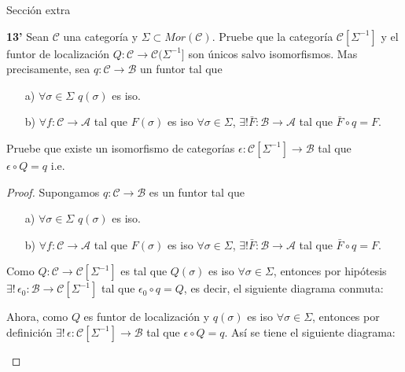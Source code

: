 \documentclass{article}
\begin{document}
\begin{enumerate}
Sección extra

\textbf{13'} Sean $\mathscr{C}$ una categoría y $\Sigma\subset Mor(\mathscr{C})$. Pruebe que la categoría $\mathscr{C}[\Sigma^{-1}]$ y el 
funtor de localización $Q:\mathscr{C}\rightarrow \mathscr{C}(\Sigma^{-1}]$ son únicos salvo isomorfismos. Mas precisamente, sea $q:\mathscr{C}
\rightarrow \mathscr{B}$ un funtor tal que 
\begin{itemize}
\item[a)] $\forall \sigma\in \Sigma$ \quad $q(\sigma)$ es iso.
\item[b)] $\forall f:\mathscr{C}\to \mathscr{A}$ tal que $F(\sigma)$ es iso $\forall \sigma\in \Sigma$, $\exists ! \bar{F}:\mathscr{B}\to\mathscr{A}$
tal que $\bar{F}\circ q=F$.\\
\end{itemize}
Pruebe que existe un isomorfismo de categorías $\epsilon:\mathscr{C}[\Sigma^{-1}]\to \mathscr{B}$ tal que \\$\epsilon\circ Q=q$ \quad i.e. \\
\centerline{
}
\begin{proof}
Supongamos $q:\mathscr{C}\to \mathscr{B}$ es un funtor tal que 
\begin{itemize}
\item[a)] $\forall \sigma\in \Sigma$ \quad $q(\sigma)$ es iso.
\item[b)] $\forall f:\mathscr{C}\to \mathscr{A}$ tal que $F(\sigma)$ es iso $\forall \sigma\in \Sigma$, $\exists ! \bar{F}:\mathscr{B}\to\mathscr{A}$
tal que $\bar{F}\circ q=F$.\\
\end{itemize}

Como $Q:\mathscr{C}\to\mathscr{C}[\Sigma^{-1}]$ es tal que $Q(\sigma)$ es iso $\forall \sigma \in \Sigma$, entonces por 
hipótesis $\exists !\,\epsilon_0:\mathscr{B}\to \mathscr{C}[\Sigma^{-1}]$ tal que $\epsilon_0\circ q=Q$, es decir, el siguiente diagrama conmuta:\\
\centerline{
}
Ahora, como $Q$ es funtor de localización y $q(\sigma)$ es iso $\forall \sigma\in \Sigma$, entonces por definición 
$\exists !\,\epsilon:\mathscr{C}[\Sigma^{-1}]\to \mathscr{B}$ tal que $\epsilon\circ Q=q$. Así se tiene el siguiente diagrama:\\
\centerline{
}


\end{proof}
\end{enumerate}
\end{document}

